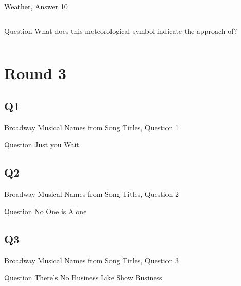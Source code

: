 \documentclass[11pt]{beamer}
\begin{document}
\begin{frame}[t]{Weather, Answer 10}
\begin{columns}[T,totalwidth=\linewidth]
\begin{column}{0.32\linewidth}
\begin{block}{Question}
What does this meteorological symbol indicate the approach of?
\end{block}
\end{column}
\begin{column}{0.65\linewidth}
\begin{center}
\texttt{[image: \{Images/coldfront]}.png}
\end{center}
\end{column}
\end{columns}
\end{frame}
\def\thisSectionName{Broadway Musical Names from Song Titles}
\section{Round 3}
\subsection*{Q1}
\begin{frame}[t]{Broadway Musical Names from Song Titles, Question 1}
\begin{block}{Question}
Just you Wait
\end{block}
\end{frame}
\subsection*{Q2}
\begin{frame}[t]{Broadway Musical Names from Song Titles, Question 2}
\begin{block}{Question}
No One is Alone
\end{block}
\end{frame}
\subsection*{Q3}
\begin{frame}[t]{Broadway Musical Names from Song Titles, Question 3}
\begin{block}{Question}
There's No Business Like Show Business
\end{block}
\end{frame}
\end{document}
